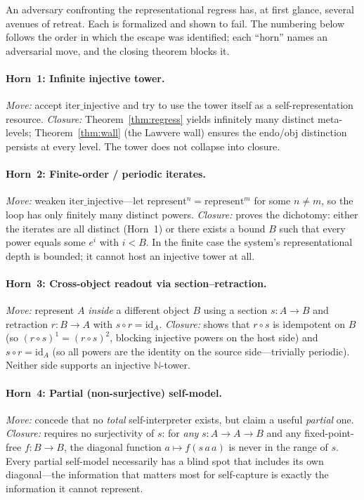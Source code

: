 \documentclass[11pt]{article}
\begin{document}
An adversary confronting the representational regress has, at first glance,
several avenues of retreat.  Each is formalized and shown to fail.  The
numbering below follows the order in which the escape was identified; each
``horn'' names an adversarial move, and the closing theorem blocks it.

\paragraph{Horn~1: Infinite injective tower.}
\emph{Move:} accept $\mathrm{iter\_injective}$ and try to use the tower itself
as a self-representation resource.
\emph{Closure:} Theorem~\ref{thm:regress} yields infinitely many distinct
meta-levels;
Theorem~\ref{thm:wall} (the Lawvere wall) ensures the endo/obj distinction
persists at every level.  The tower does not collapse into closure.

\paragraph{Horn~2: Finite-order / periodic iterates.}
\emph{Move:} weaken $\mathrm{iter\_injective}$---let
$\mathrm{represent}^n = \mathrm{represent}^m$ for some $n \neq m$, so the
loop has only finitely many distinct powers.\newline
\noindent\emph{Closure:}
proves the dichotomy: either the iterates are all distinct (Horn~1) or
there exists a bound $B$ such that every power equals some $e^i$ with
$i < B$.  In the finite case the system's representational depth is
bounded; it cannot host an injective tower at all.

\paragraph{Horn~3: Cross-object readout via section--retraction.}
\emph{Move:} represent $A$ \emph{inside} a different object $B$ using a
section $s : A \to B$ and retraction $r : B \to A$ with $s \circ r = \mathrm{id}_A$.
\emph{Closure:}
shows that $r \circ s$ is idempotent on $B$ (so $(r \circ s)^1 = (r \circ s)^2$,
blocking injective powers on the host side) and $s \circ r = \mathrm{id}_A$
(so all powers are the identity on the source side---trivially periodic).
Neither side supports an injective $\mathbb{N}$-tower.

\paragraph{Horn~4: Partial (non-surjective) self-model.}
\emph{Move:} concede that no \emph{total} self-interpreter exists, but claim
a useful \emph{partial} one.
\emph{Closure:}
requires no surjectivity of $s$: for \emph{any} $s : A \to A \to B$ and any
fixed-point-free $f : B \to B$, the diagonal function $a \mapsto f(s\,a\,a)$
is never in the range of $s$.  Every partial self-model necessarily has a
blind spot that includes its own diagonal---the information that matters most
for self-capture is exactly the information it cannot represent.
\end{document}
